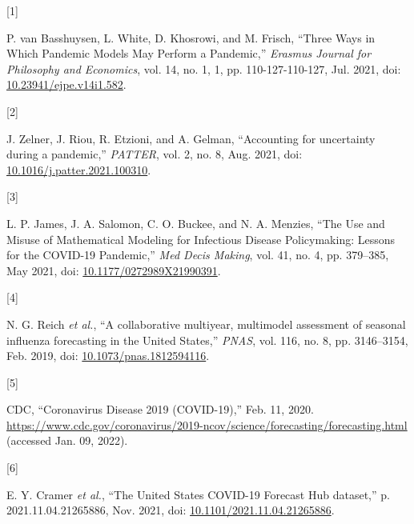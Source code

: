 \documentclass[
]{article}
\newlength{\cslhangindent}
\newlength{\csllabelwidth}
\newlength{\cslentryspacingunit} %
\newenvironment{CSLReferences}[2] %
 {%
  \setlength{\parindent}{0pt}
  \ifodd #1
  \let\oldpar\par
  \def\par{\hangindent=\cslhangindent\oldpar}
  \fi
  \setlength{\parskip}{#2\cslentryspacingunit}
 }%
 {}
\newcommand{\CSLLeftMargin}[1]{\parbox[t]{\csllabelwidth}{#1}}
\newcommand{\CSLRightInline}[1]{\parbox[t]{\linewidth - \csllabelwidth}{#1}\break}
\begin{document}
\hypertarget{refs}{}
\begin{CSLReferences}{0}{0}
\leavevmode{}%
\CSLLeftMargin{{[}1{]} }
\CSLRightInline{P. van Basshuysen, L. White, D. Khosrowi, and M. Frisch,
{``Three {Ways} in {Which Pandemic Models May Perform} a {Pandemic},''}
\emph{Erasmus Journal for Philosophy and Economics}, vol. 14, no. 1, 1,
pp. 110-127-110-127, Jul. 2021, doi:
\href{https://doi.org/10.23941/ejpe.v14i1.582}{10.23941/ejpe.v14i1.582}.}

\leavevmode{}%
\CSLLeftMargin{{[}2{]} }
\CSLRightInline{J. Zelner, J. Riou, R. Etzioni, and A. Gelman,
{``Accounting for uncertainty during a pandemic,''} \emph{PATTER}, vol.
2, no. 8, Aug. 2021, doi:
\href{https://doi.org/10.1016/j.patter.2021.100310}{10.1016/j.patter.2021.100310}.}

\leavevmode{}%
\CSLLeftMargin{{[}3{]} }
\CSLRightInline{L. P. James, J. A. Salomon, C. O. Buckee, and N. A.
Menzies, {``The {Use} and {Misuse} of {Mathematical Modeling} for
{Infectious Disease Policymaking}: {Lessons} for the {COVID-19
Pandemic},''} \emph{Med Decis Making}, vol. 41, no. 4, pp. 379--385, May
2021, doi:
\href{https://doi.org/10.1177/0272989X21990391}{10.1177/0272989X21990391}.}

\leavevmode{}%
\CSLLeftMargin{{[}4{]} }
\CSLRightInline{N. G. Reich \emph{et al.}, {``A collaborative multiyear,
multimodel assessment of seasonal influenza forecasting in the {United
States},''} \emph{PNAS}, vol. 116, no. 8, pp. 3146--3154, Feb. 2019,
doi:
\href{https://doi.org/10.1073/pnas.1812594116}{10.1073/pnas.1812594116}.}

\leavevmode{}%
\CSLLeftMargin{{[}5{]} }
\CSLRightInline{CDC, {``Coronavirus {Disease} 2019 ({COVID-19}),''} Feb.
11, 2020.
\url{https://www.cdc.gov/coronavirus/2019-ncov/science/forecasting/forecasting.html}
(accessed Jan. 09, 2022).}

\leavevmode{}%
\CSLLeftMargin{{[}6{]} }
\CSLRightInline{E. Y. Cramer \emph{et al.}, {``The {United States
COVID-19 Forecast Hub} dataset,''} p. 2021.11.04.21265886, Nov. 2021,
doi:
\href{https://doi.org/10.1101/2021.11.04.21265886}{10.1101/2021.11.04.21265886}.}


\end{CSLReferences}
\end{document}
